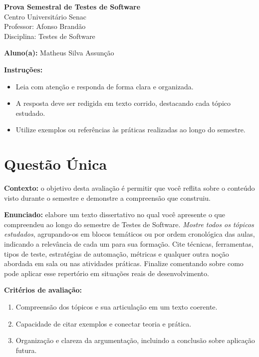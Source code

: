 \documentclass[12pt]{article}
\begin{document}
\newpage


\begin{center}
  {\Large \textbf{Prova Semestral de Testes de Software}}\\
  Centro Universitário Senac\\
  Professor: Afonso Brandão\\
  Disciplina: Testes de Software
\end{center}

\vspace{0.4cm}

\begin{center}
  \textbf{Aluno(a):} Matheus Silva Assunção
\end{center}

\vspace{0.5cm}

\begin{center}
  \textbf{Instruções:}
\end{center}
\begin{itemize}[leftmargin=*]
  \item Leia com atenção e responda de forma clara e organizada.
  \item A resposta deve ser redigida em texto corrido, destacando cada tópico estudado.
  \item Utilize exemplos ou referências às práticas realizadas ao longo do semestre.
\end{itemize}

\section*{Questão Única}
\textbf{Contexto:} o objetivo desta avaliação é permitir que você reflita sobre o conteúdo visto durante o semestre e demonstre a compreensão que construiu.

\textbf{Enunciado:} elabore um texto dissertativo no qual você apresente o que compreendeu ao longo do semestre de Testes de Software. \textit{Mostre todos os tópicos estudados}, agrupando-os em blocos temáticos ou por ordem cronológica das aulas, indicando a relevância de cada um para sua formação. Cite técnicas, ferramentas, tipos de teste, estratégias de automação, métricas e qualquer outra noção abordada em sala ou nas atividades práticas. Finalize comentando sobre como pode aplicar esse repertório em situações reais de desenvolvimento.

\textbf{Critérios de avaliação:}
\begin{enumerate}[label=\arabic*.]
  \item Compreensão dos tópicos e sua articulação em um texto coerente.
  \item Capacidade de citar exemplos e conectar teoria e prática.
  \item Organização e clareza da argumentação, incluindo a conclusão sobre aplicação futura.
\end{enumerate}
\end{document}
